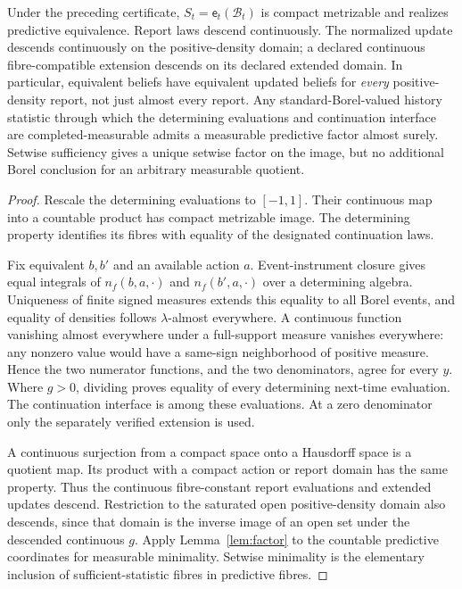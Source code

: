\begin{proposition}\label{prop:quotient}
Under the preceding certificate, $S_t=\mathsf e_t(\mathcal B_t)$ is compact metrizable and realizes predictive equivalence. Report laws descend continuously. The normalized update descends continuously on the positive-density domain; a declared continuous fibre-compatible extension descends on its declared extended domain. In particular, equivalent beliefs have equivalent updated beliefs for \emph{every} positive-density report, not just almost every report. Any standard-Borel-valued history statistic through which the determining evaluations and continuation interface are completed-measurable admits a measurable predictive factor almost surely. Setwise sufficiency gives a unique setwise factor on the image, but no additional Borel conclusion for an arbitrary measurable quotient.
\end{proposition}
\begin{proof}
Rescale the determining evaluations to $[-1,1]$. Their continuous map into a countable product has compact metrizable image. The determining property identifies its fibres with equality of the designated continuation laws.

Fix equivalent $b,b'$ and an available action $a$. Event-instrument closure gives equal integrals of $n_f(b,a,\cdot)$ and $n_f(b',a,\cdot)$ over a determining algebra. Uniqueness of finite signed measures extends this equality to all Borel events, and equality of densities follows $\lambda$-almost everywhere. A continuous function vanishing almost everywhere under a full-support measure vanishes everywhere: any nonzero value would have a same-sign neighborhood of positive measure. Hence the two numerator functions, and the two denominators, agree for every $y$. Where $g>0$, dividing proves equality of every determining next-time evaluation. The continuation interface is among these evaluations. At a zero denominator only the separately verified extension is used.

A continuous surjection from a compact space onto a Hausdorff space is a quotient map. Its product with a compact action or report domain has the same property. Thus the continuous fibre-constant report evaluations and extended updates descend. Restriction to the saturated open positive-density domain also descends, since that domain is the inverse image of an open set under the descended continuous $g$. Apply Lemma~\ref{lem:factor} to the countable predictive coordinates for measurable minimality. Setwise minimality is the elementary inclusion of sufficient-statistic fibres in predictive fibres.
\end{proof}

